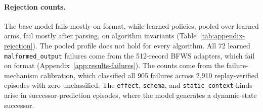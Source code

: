 \paragraph{Rejection counts.}
The base model fails mostly on format, while learned policies, pooled over learned arms, fail mostly after parsing, on algorithm invariants (Table~\ref{tab:appendix-rejection}). The pooled profile does not hold for every algorithm. All 72 learned \texttt{malformed\_output} failures come from the 512-record BFWS adapters, which fail on format (Appendix~\ref{app:results-failures}). The counts come from the failure-mechanism calibration, which classified all 905 failures across 2,910 replay-verified episodes with zero unclassified. The \texttt{effect}, \texttt{schema}, and \texttt{static\_context} kinds arise in successor-prediction episodes, where the model generates a dynamic-state successor.

